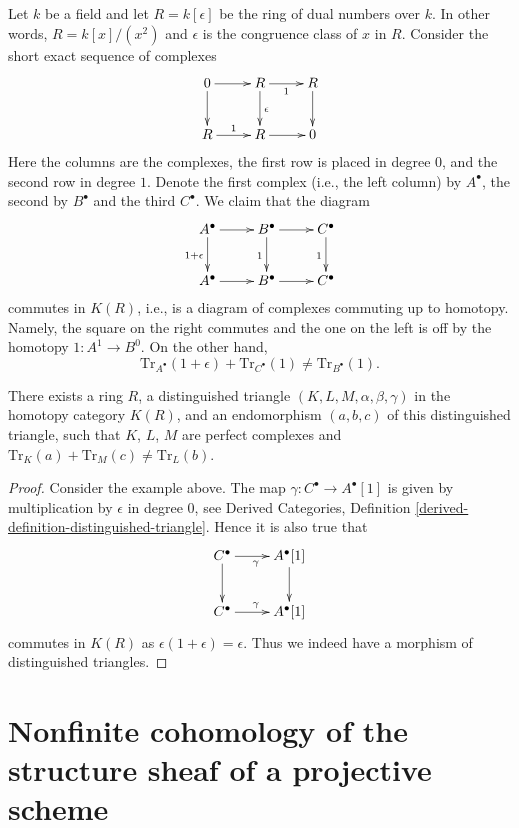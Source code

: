 \noindent
Let $k$ be a field and let $R = k[\epsilon]$ be the ring of dual numbers
over $k$. In other words, $R = k[x]/(x^2)$ and $\epsilon$ is the congruence
class of $x$ in $R$. Consider the short exact sequence of complexes
$$
\xymatrix{
0 \ar[d] \ar[r] &
R \ar[d]^\epsilon \ar[r]_1 &
R \ar[d] \\
R \ar[r]^1 & R \ar[r] & 0
}
$$
Here the columns are the complexes, the first row is placed in degree $0$, and
the second row in degree $1$. Denote the first complex (i.e., the
left column) by $A^\bullet$, the second by $B^\bullet$ and the third
$C^\bullet$. We claim that the diagram
\begin{equation}
\label{equation-commutes-up-to-homotopy}
\vcenter{
\xymatrix{
A^\bullet \ar[d]_{1 + \epsilon} \ar[r] &
B^\bullet \ar[r] \ar[d]_1 &
C^\bullet \ar[d]_1 \\
A^\bullet \ar[r] & B^\bullet \ar[r] & C^\bullet
}
}
\end{equation}
commutes in $K(R)$, i.e., is a diagram of complexes commuting up to homotopy.
Namely, the square on the right commutes and the one on the left is off by
the homotopy $1 : A^1 \to B^0$. On the other hand,
$$
\text{Tr}_{A^\bullet}(1 + \epsilon) + \text{Tr}_{C^\bullet}(1)
\not = \text{Tr}_{B^\bullet}(1).
$$

\begin{lemma}
\label{lemma-nonadditivity-of-trace}
There exists a ring $R$, a distinguished triangle
$(K, L, M, \alpha, \beta, \gamma)$ in the homotopy category $K(R)$,
and an endomorphism $(a, b, c)$ of this distinguished triangle, such that
$K$, $L$, $M$ are perfect complexes and
$\text{Tr}_K(a) + \text{Tr}_M(c) \not = \text{Tr}_L(b)$.
\end{lemma}

\begin{proof}
Consider the example above. The map $\gamma : C^\bullet \to A^\bullet[1]$
is given by multiplication by $\epsilon$ in degree $0$, see
Derived Categories, Definition \ref{derived-definition-distinguished-triangle}.
Hence it is also true that
$$
\xymatrix{
C^\bullet \ar[d] \ar[r]_\gamma & A^\bullet[1] \ar[d] \\
C^\bullet \ar[r]^\gamma & A^\bullet[1]
}
$$
commutes in $K(R)$ as $\epsilon(1 + \epsilon) = \epsilon$.
Thus we indeed have a morphism of distinguished triangles.
\end{proof}




\section{Nonfinite cohomology of the structure sheaf of a projective scheme}
\label{section-nonfinite-h0}

